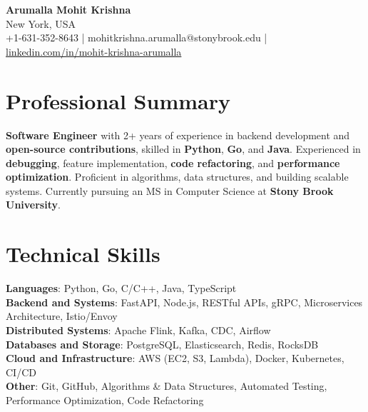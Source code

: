\documentclass[letterpaper,11pt]{article}
\begin{document}
\begin{center}
  {\Large \textbf{Arumalla Mohit Krishna}} \\
  New York, USA \\
  +1-631-352-8643 \enspace | \enspace mohitkrishna.arumalla@stonybrook.edu \enspace | \enspace \href{https://www.linkedin.com/in/mohit-krishna-arumalla}{linkedin.com/in/mohit-krishna-arumalla}
\end{center}

\section{Professional Summary}
  \begin{itemize}[leftmargin=0.15in, label={}]
    \small{\item{
     \textbf{Software Engineer} with 2+ years of experience in backend development and \textbf{open-source contributions}, skilled in \textbf{Python}, \textbf{Go}, and \textbf{Java}. Experienced in \textbf{debugging}, feature implementation, \textbf{code refactoring}, and \textbf{performance optimization}. Proficient in algorithms, data structures, and building scalable systems. Currently pursuing an MS in Computer Science at \textbf{Stony Brook University}.
    }}
  \end{itemize}
\vspace{-16pt}

\section{Technical Skills}
 \begin{itemize}[leftmargin=0.15in, label={}]
    \small{\item{
     \textbf{Languages}: Python, Go, C/C++, Java, TypeScript \\
     \textbf{Backend and Systems}: FastAPI, Node.js, RESTful APIs, gRPC, Microservices Architecture, Istio/Envoy \\
     \textbf{Distributed Systems}: Apache Flink, Kafka, CDC, Airflow \\
     \textbf{Databases and Storage}: PostgreSQL, Elasticsearch, Redis, RocksDB \\
     \textbf{Cloud and Infrastructure}: AWS (EC2, S3, Lambda), Docker, Kubernetes, CI/CD \\
     \textbf{Other}: Git, GitHub, Algorithms \& Data Structures, Automated Testing, Performance Optimization, Code Refactoring
    }}
 \end{itemize}
\vspace{-16pt}
\end{document}
